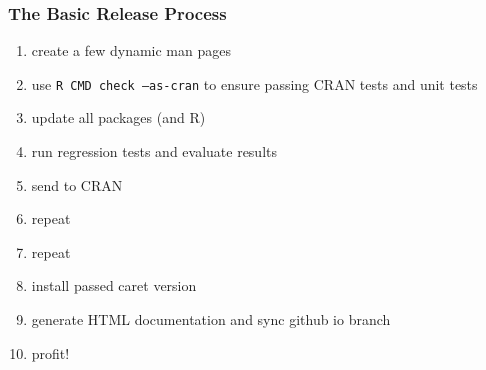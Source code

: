 \documentclass[12 pt]{beamer}\usepackage[]{graphicx}\usepackage[]{color}
\newcommand{\pkg}[1]{{\fontseries{b}\selectfont #1}}
\renewcommand{\pkg}[1]{{\color{darkgreen}\textsf{#1}}}
\begin{document}
  
  \begin{frame}[fragile]
\frametitle{The Basic Release Process}

\begin{enumerate}
\item create a few dynamic man pages
\item use {\color{darkred} \texttt{R CMD check --as-cran}} to ensure passing CRAN tests and {\color{darkred} unit tests}
\item update all packages (and R)
\item run {\color{darkred} regression tests} and evaluate results
\item send to CRAN
\item repeat
\item repeat
\item install passed \pkg{caret} version 
\item generate {\color{darkred} HTML documentation} and sync github io branch
\item profit!
\end{enumerate}

\end{frame}

  
\end{document}
